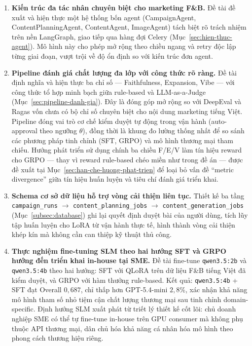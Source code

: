 \begin{enumerate}
  \item \textbf{Kiến trúc đa tác nhân chuyên biệt cho marketing F\&B.}
    Đề tài đề xuất và hiện thực một hệ thống bốn agent (CampaignAgent,
    ContentPlanningAgent, ContentAgent, ImageAgent) tách biệt rõ trách
    nhiệm trên nền LangGraph, giao tiếp qua hàng đợi Celery
    (Mục~\ref{sec:hien-thuc-agent}). Mô hình này cho phép mở rộng theo
    chiều ngang và retry độc lập từng giai đoạn, vượt trội về độ ổn
    định so với kiến trúc đơn agent.

  \item \textbf{Pipeline đánh giá chất lượng đa lớp với công thức rõ
    ràng.} Đề tài định nghĩa và hiện thực ba chỉ số --- Faithfulness,
    Expansion, Vibe --- với công thức tổ hợp minh bạch giữa rule-based
    và LLM-as-a-Judge (Mục~\ref{sec:pipeline-danh-gia}). Đây là đóng
    góp mở rộng so với DeepEval và Ragas vốn chưa có bộ chỉ số chuyên
    biệt cho nội dung marketing tiếng Việt. Pipeline đóng vai trò cơ
    chế kiểm duyệt tự động trong vận hành (auto-approval theo ngưỡng
    $\theta$), đồng thời là khung đo lường thống nhất để so sánh các
    phương pháp tinh chỉnh (SFT, GRPO) và mô hình thương mại tham
    chiếu. Hướng phát triển sử dụng chính ba chiều F/E/V làm tín hiệu
    reward cho GRPO --- thay vì reward rule-based chéo miền như trong
    đề án --- được đề xuất tại Mục~\ref{sec:han-che-huong-phat-trien}
    để loại bỏ vấn đề ``metric divergence'' giữa tín hiệu huấn luyện
    và tiêu chí đánh giá triển khai.

  \item \textbf{Schema cơ sở dữ liệu hỗ trợ vòng cải thiện liên tục.}
    Thiết kế ba tầng \texttt{campaign\_runs} $\rightarrow$
    \texttt{content\_planning\_jobs} $\rightarrow$
    \texttt{content\_generation\_jobs} (Mục~\ref{subsec:database}) ghi
    lại quyết định duyệt bài của người dùng, tích lũy tập huấn luyện
    cho LoRA từ vận hành thực tế, hình thành vòng cải thiện khép kín
    mà không cần can thiệp kỹ thuật thủ công.

  \item \textbf{Thực nghiệm fine-tuning SLM theo hai hướng SFT và GRPO
    hướng đến triển khai in-house tại SME.} Đề tài fine-tune
    \texttt{qwen3.5:2b} và \texttt{qwen3.5:4b} theo hai hướng: SFT với
    QLoRA trên dữ liệu F\&B tiếng Việt đã kiểm duyệt, và GRPO với hàm
    thưởng rule-based. Kết quả: \texttt{qwen3.5:4b} + SFT đạt Overall
    $0{,}687$, chỉ thấp hơn GPT-5.4-mini $2{,}8\%$, xác nhận khả năng
    mô hình tham số nhỏ tiệm cận chất lượng thương mại sau tinh chỉnh
    domain-specific. Định hướng SLM xuất phát từ triết lý thiết kế cốt
    lõi: chủ doanh nghiệp SME có thể tự fine-tune in-house trên GPU
    consumer mà không phụ thuộc API thương mại, dân chủ hóa khả năng
    cá nhân hóa mô hình theo phong cách thương hiệu riêng.
\end{enumerate}

